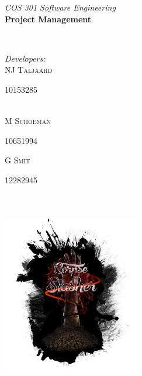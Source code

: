 \documentclass[letterpaper]{article}
\makeatletter
\def\printauthor{%
    {\large \@author}}
\makeatother
\begin{document}
\begin{titlepage}
\begin{center}
\begin{minipage}{0.4\textwidth}
\begin{flushleft} \large
\emph{COS 301 Software Engineering}\\
\vspace{1cm}\textbf{Project Management}
\end{flushleft}
\end{minipage}
~
\begin{minipage}{0.4\textwidth}
	\begin{flushright} \large
	\emph{Developers:} \\
		NJ \textsc{Taljaard} \\
			\begin{small}
				10153285
			\end{small} \\
		M  \textsc{Schoeman} \\
			\begin{small}
				10651994 \\
			\end{small}
		G  \textsc{Smit} \\
			\begin{small}
				12282945
			\end{small}
	\end{flushright}
\end{minipage}\\



\includegraphics[width=60mm, height=80mm]{corpseslasher.png}\\ %
 
\end{center}
\vfill %

\end{titlepage}
\end{document}
